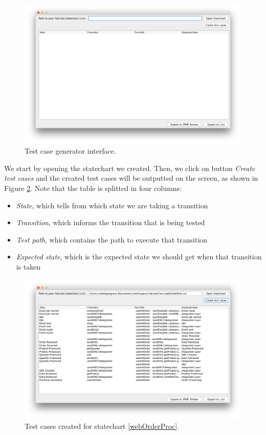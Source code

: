 \begin{figure}[htb]
\centering
\includegraphics[width=\textwidth]{figuras/testGenClean}
\caption{\label{testGenClean} Test case generator interface.}
\end{figure}

We start by opening the statechart we created. Then, we click on button \textit{Create test cases} and the created test cases will be outputted on the screen, as shown in Figure \ref{testGenResults}. Note that the table is splitted in four columns: 
\begin{itemize}
\item \textit{State}, which tells from which state we are taking a transition
\item \textit{Transition}, which informs the transition that is being tested 
\item \textit{Test path}, which contains the path to execute that transition
\item \textit{Expected state}, which is the expected state we should get when that transition is taken
\end{itemize}

\begin{figure}[htb]
\centering
\includegraphics[width=\textwidth]{figuras/testGenResults}
\caption{\label{testGenResults} Test cases created for statechart \ref{webOrderProc}.}
\end{figure}

